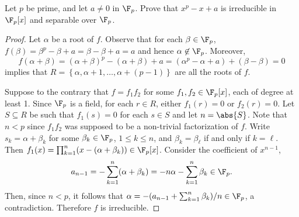 \documentclass[10pt]{amsart}
\begin{document}
\begin{thm}
  Let $p$ be prime, and let $a \neq 0$ in $\F_p$.
  Prove that $x^p - x + a$ is irreducible in $\F_p[x]$ and separable over $\F_p$.
  \begin{proof}
    Let $\alpha$ be a root of $f$.
    Observe that for each $\beta \in \F_p$, $f(\beta) = \beta^p - \beta + a = \beta - \beta + a = a$ and hence $\alpha \not \in \F_p$.
    Moreover,
    $$f(\alpha + \beta) = (\alpha + \beta)^p - (\alpha + \beta) + a = (\alpha^p - \alpha + a) + (\beta - \beta) = 0$$
    implies that $R = \left\{\alpha, \alpha + 1, \ldots, \alpha + (p-1)\right\}$ are all the roots of $f$.
    
    Suppose to the contrary that $f = f_1f_2$ for some $f_1, f_2 \in \F_p[x]$, each of degree at least 1.
    Since $\F_p$ is a field, for each $r \in R$, either $f_1(r) = 0$ or $f_2(r) = 0$.
    Let $S \subseteq R$ be such that $f_1(s) = 0$ for each $s \in S$ and let $n = \abs{S}$.
    Note that $n < p$ since $f_1f_2$ was supposed to be a non-trivial factorization of $f$.
    Write $s_k = \alpha + \beta_k$ for some $\beta_k \in \F_p$, $1 \leq k \leq n$, and $\beta_k = \beta_\ell$ if and only if $k = \ell$.
    Then $f_1(x) = \prod_{k=1}^n (x - (\alpha + \beta_k)) \in \F_p[x]$.
    Consider the coefficient of $x^{n-1}$, 
    $$a_{n-1} = - \sum_{k=1}^n (\alpha + \beta_k) = - n\alpha - \sum_{k=1}^n \beta_k \in \F_p.$$
    Then, since $n < p$, it follows that $\alpha = -(a_{n-1} + \sum_{k=1}^n \beta_k)/n \in \F_p$, a contradiction.
    Therefore $f$ is irreducible.
    
  \end{proof}
\end{thm}
\end{document}
